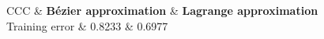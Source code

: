 \begin{table}[!h] 
\caption{Leave-one-out cross-validation training errors for the considered mathematical model corresponding to the B{\'e}zier and the Lagrande approximations, respectively.\label{table1}}
\begin{tabularx}{\textwidth}{CCC}
\hline
& \textbf{B{\'e}zier approximation}	& \textbf{Lagrange approximation}\\
\hline 
Training error		& 0.8233 &  0.6977 \\
\hline
\end{tabularx}
\end{table}